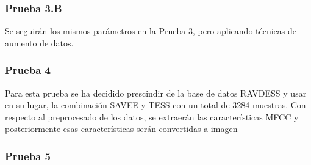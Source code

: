 \documentclass[11pt,a4paper,spanish]{book}
\begin{document}
	\subsubsection{Prueba 3.B}
	Se seguirán los mismos parámetros en la Prueba 3, pero aplicando técnicas de aumento de datos.
	
	\subsubsection{Prueba 4}
	Para esta prueba se ha decidido prescindir de la base de datos RAVDESS y usar en su lugar, la combinación SAVEE y TESS con un total de 3284 muestras. Con respecto al preprocesado de los datos, se extraerán las características MFCC y posteriormente esas características serán convertidas a imagen
	
	\subsubsection{Prueba 5}
	
	
	
	
	

		
		
		

	
	
	
		\printbibliography
	
\end{document}
